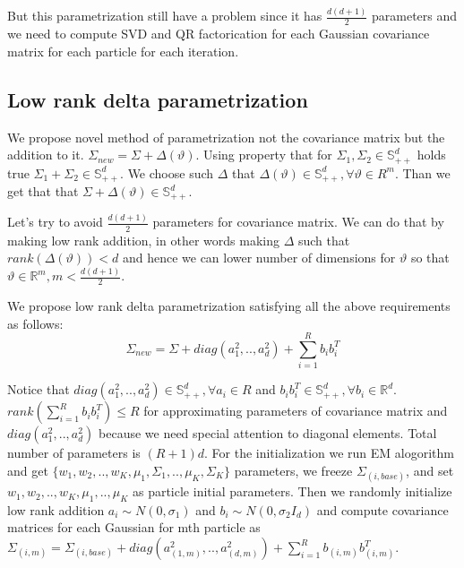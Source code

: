 \documentclass[a4paper]{article}
\begin{document}
But this parametrization still have a problem since it has $\frac{d(d+1)}{2}$ parameters and we need to compute SVD 
and QR factorication for each Gaussian covariance matrix for each particle for each iteration.

\subsection{Low rank delta parametrization}

We propose novel method of parametrization not the covariance matrix but the addition to it. $\Sigma_{new}  = \Sigma + \Delta(\vartheta)$. 
Using property that for $\Sigma_1, \Sigma_2 \in \mathbb{S}^d_{++}$ holds true $\Sigma_1 + \Sigma_2 \in \mathbb{S}^d_{++}$.
We choose such $\Delta$ that $\Delta(\vartheta) \in \mathbb{S}^d_{++}, \forall \vartheta \in R^m$. 
Than we get that that $\Sigma + \Delta(\vartheta) \in \mathbb{S}^d_{++}$.

Let's try to avoid $\frac{d(d+1)}{2}$ parameters for covariance matrix. We can do that by making low rank addition,
 in other words making $\Delta$ such that $rank(\Delta(\vartheta)) < d$ and 
 hence we can lower number of dimensions for $\vartheta$ so that $\vartheta \in \mathbb{R}^{m}, m < \frac{d(d+1)}{2}$.

 We propose low rank delta parametrization satisfying all the above requirements as follows:
 $$\Sigma_{new}  = \Sigma + diag(a_1^2, .., a_d^2) + \sum_{i=1}^{R}b_ib_i^T$$

 Notice that $diag(a_1^2, .., a_d^2) \in \mathbb{S}^d_{++}, \forall a_i \in R$ and $b_ib_i^T \in \mathbb{S}^d_{++}, \forall b_i \in \mathbb{R}^{d}$. 
 $rank(\sum_{i=1}^{R} b_ib_i^T) \leq R$ for approximating parameters of covariance matrix and 
 $diag(a_1^2, .., a_d^2)$ because we need special attention to diagonal elements. 
 Total number of parameters is $(R + 1)d$. For the initialization we run EM alogorithm and get 
 $\{w_1, w_2, .., w_K, \mu_1, \Sigma_1, .., \mu_K, \Sigma_K\}$ parameters, we freeze $\Sigma_{(i, base)}$, 
 and set ${w_1, w_2, .., w_K, \mu_1, .., \mu_K}$ as particle initial parameters. 
 Then we randomly initialize low rank addition $a_i \sim N(0, \sigma_1)$ and $b_i \sim N(0, \sigma_2 I_d)$ and 
 compute covariance matrices for each Gaussian for mth particle as 
 $\Sigma_{(i, m)} = \Sigma_{(i, base)} + diag(a_{(1, m)}^2, .., a_{(d, m)}^2) + \sum_{i=1}^{R}b_{(i, m)}b_{(i, m)}^T$. 
\end{document}
